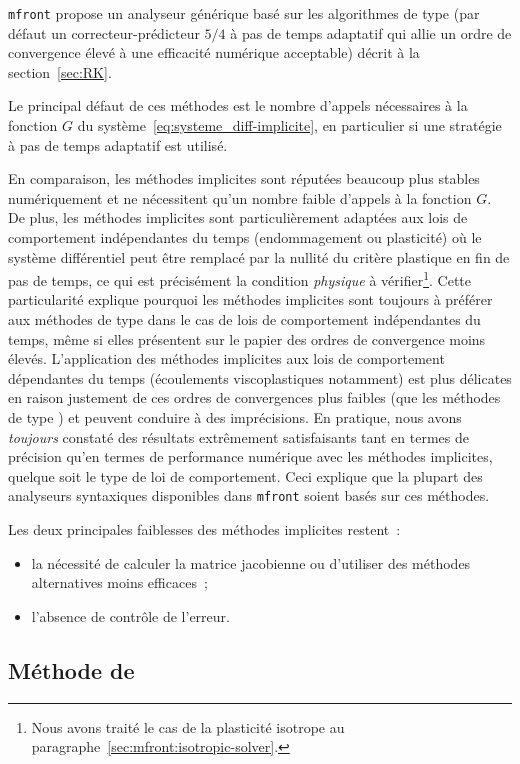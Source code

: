 \documentclass[rectoverso,pleiades,pstricks,leqno,anti]{texmf/note_technique_2010}
\newcommand{\mfront}{\texttt{mfront}}
\begin{document}
\mfront{} propose un analyseur générique basé sur les algorithmes de
type  (par défaut un correcteur-prédicteur \(5/4\) à
pas de temps adaptatif qui allie un ordre de convergence élevé à une
efficacité numérique acceptable) décrit à la section~\ref{sec:RK}.

Le principal défaut de ces méthodes est le nombre d'appels nécessaires à
la fonction \(G\) du système~\eqref{eq:systeme_diff-implicite}, en
particulier si une stratégie à pas de temps adaptatif est utilisé.

En comparaison, les méthodes implicites sont réputées beaucoup plus
stables numériquement et ne nécessitent qu'un nombre faible d'appels à
la fonction \(G\). De plus, les méthodes implicites sont
particulièrement adaptées aux lois de comportement indépendantes du
temps (endommagement ou plasticité) où le système différentiel peut être
remplacé par la nullité du critère plastique en fin de pas de temps, ce
qui est précisément la condition {\em physique} à vérifier\footnote{Nous
  avons traité le cas de la plasticité isotrope au
  paragraphe~\ref{sec:mfront:isotropic-solver}.}. Cette particularité
explique pourquoi les méthodes implicites sont toujours à préférer aux
méthodes de type  dans le cas de lois de comportement
indépendantes du temps, même si elles présentent sur le papier des
ordres de convergence moins élevés. L'application des méthodes
implicites aux lois de comportement dépendantes du temps (écoulements
viscoplastiques notamment) est plus délicates en raison justement de ces
ordres de convergences plus faibles (que les méthodes de type
) et peuvent conduire à des imprécisions. En pratique,
nous avons {\em toujours} constaté des résultats extrêmement
satisfaisants tant en termes de précision qu'en termes de performance
numérique avec les méthodes implicites, quelque soit le type de loi de
comportement. Ceci explique que la plupart des analyseurs syntaxiques
disponibles dans \mfront{} soient basés sur ces méthodes.

Les deux principales faiblesses des méthodes implicites restent~:
\begin{itemize}
  \item la nécessité de calculer la matrice jacobienne ou d'utiliser des
  méthodes alternatives moins efficaces~;
  \item l'absence de contrôle de l'erreur.
\end{itemize}

\subsection{Méthode de }
\label{sec:NR}
\end{document}
